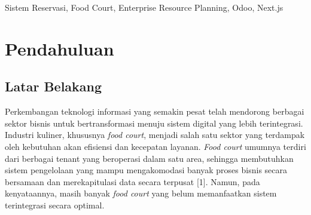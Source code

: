 \documentclass[conference]{IEEEtran}
\begin{document}
\begin{abstract}
Pengelolaan \textit{food court} secara konvensional rentan terhadap berbagai permasalahan operasional, seperti pemesanan ganda (\textit{double booking}), kesulitan pemantauan ketersediaan meja secara \textit{real-time}, dan kurangnya integrasi data antar-pemangku kepentingan. Penelitian ini mengembangkan Sistem Reservasi \textit{Food Court} berbasis \textit{Enterprise Resource Planning} (ERP) yang mengintegrasikan platform \textit{web frontend} (Next.js) dengan \textit{backend} Odoo ERP melalui XML-RPC API. Sistem ini menyediakan fitur reservasi meja bertahap (\textit{multi-step booking}), peta denah lantai interaktif, \textit{pre-order} menu makanan, integrasi pembayaran digital via Midtrans Snap, serta dasbor analitik bagi manajemen. Pada sisi \textit{backend}, dikembangkan modul kustom \texttt{foodcourt} yang mengimplementasikan \textit{state machine} reservasi tujuh kondisi, mekanisme pencegahan pemesanan ganda, pembuatan pesanan POS otomatis saat \textit{check-in}, serta tiga \textit{cron job} untuk menjaga integritas data secara otomatis. Pengujian dilakukan menggunakan metode \textit{Black-Box Testing} dengan sepuluh skenario yang mencakup seluruh alur bisnis inti. Seluruh skenario pengujian berhasil dieksekusi sesuai dengan hasil yang diharapkan, membuktikan bahwa sistem mampu meningkatkan efisiensi operasional dan kualitas layanan reservasi \textit{food court} secara signifikan.
\end{abstract}

\begin{IEEEkeywords}
Sistem Reservasi, Food Court, Enterprise Resource Planning, Odoo, Next.js \end{IEEEkeywords}


\section{Pendahuluan}


\subsection{Latar Belakang}
Perkembangan teknologi informasi yang semakin pesat telah mendorong berbagai sektor bisnis untuk bertransformasi menuju sistem digital yang lebih terintegrasi. Industri kuliner, khususnya \textit{food court}, menjadi salah satu sektor yang terdampak oleh kebutuhan akan efisiensi dan kecepatan layanan. \textit{Food court} umumnya terdiri dari berbagai tenant yang beroperasi dalam satu area, sehingga membutuhkan sistem pengelolaan yang mampu mengakomodasi banyak proses bisnis secara bersamaan dan merekapitulasi data secara terpusat [1]. Namun, pada kenyataannya, masih banyak \textit{food court} yang belum memanfaatkan sistem terintegrasi secara optimal.
\end{document}
